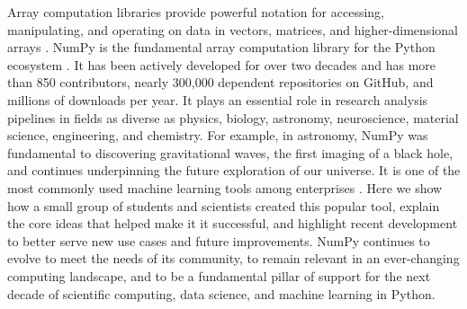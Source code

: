 




Array computation libraries provide powerful notation for accessing,
manipulating, and operating on data in vectors, matrices, and
higher-dimensional arrays \cite{iverson1980notation}.
NumPy is the fundamental array computation library for the Python ecosystem
\cite{dubois2007guest,oliphant2007python,millman2011python,perez2011python}.
It has been actively developed for over two decades and has more than 850
contributors, nearly 300,000 dependent repositories on GitHub, and millions of
downloads per year.
It plays an essential role in research analysis pipelines in fields as
diverse as physics, biology, astronomy, neuroscience, material science,
engineering, and chemistry.
For example, in astronomy, NumPy was fundamental to discovering gravitational
waves\cite{pycbc}, the first imaging of a black hole\cite{eht-imaging}, and
continues underpinning the future exploration of our
universe\cite{jenness2018lsst}.
It is one of the most commonly used machine learning tools among
enterprises \cite{451report2018}.
Here we show how a small group of students and scientists created this
popular tool, explain the core ideas that helped make it it successful,
and highlight recent development to better serve new use cases
and future improvements.
NumPy continues to evolve to meet the needs of its community, to remain
relevant in an ever-changing computing landscape, and to be a fundamental
pillar of support for the next decade of scientific computing, data science,
and machine learning in Python.
